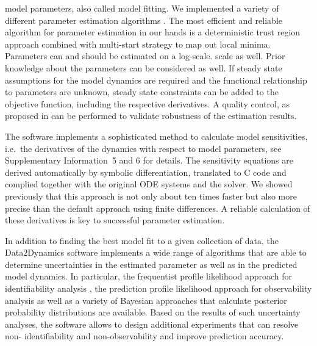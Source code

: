 \documentclass{bioinfo}
\begin{document}
model parameters, also called model fitting. We implemented a variety of different parameter 
estimation algorithms \citep{Raue:2012zt}. The most efficient and reliable algorithm for 
parameter estimation in our hands is a deterministic trust region approach combined with 
multi-start strategy to map out local minima. Parameters can and should be estimated on a 
log-scale. %
scale as well. 
Prior knowledge about the parameters can be considered as well. 
If steady state assumptions %
for the model dynamics are required and the functional relationship to parameters are 
unknown, %
steady state constraints can be added to the objective function, including the respective 
derivatives. A quality control, as proposed in \citet{Raue:2012zt} can be performed to validate 
robustness of the estimation results.

The software implements a sophisticated method to calculate model sensitivities, i.e.~the 
derivatives of the dynamics with respect to model parameters, see Supplementary 
Information~5 and 6 for details. The sensitivity equations are derived automatically by 
symbolic differentiation, translated to C code and complied together with the original ODE 
systems and the solver. We showed previously \citep{Raue:2012zt} that this approach is not 
only about ten times faster but also more precise than the default approach using finite 
differences. A reliable calculation of these derivatives is key to successful parameter 
estimation. 

In addition to finding the best model fit to a given collection of data, the Data2Dynamics 
software implements a wide range of algorithms that are able to determine uncertainties in the 
estimated parameter as well as in the predicted model dynamics. In particular, the frequentist 
profile likelihood approach for identifiability analysis \citep{Raue:2009ec}, the prediction profile 
likelihood approach for observability analysis \citep{Kreutz:2011kx} as well as a variety of 
Bayesian approaches \citep{Raue:2013fk, Hug:2012fk} that calculate posterior probability 
distributions are available. Based on the results of such uncertainty analyses, the software 
allows to design additional experiments \citep{Steiert:2012fk} that can resolve non-
identifiability and non-observability \citep{Raue:2010fk, Kreutz:2013uq} and improve prediction 
accuracy.
\end{document}
